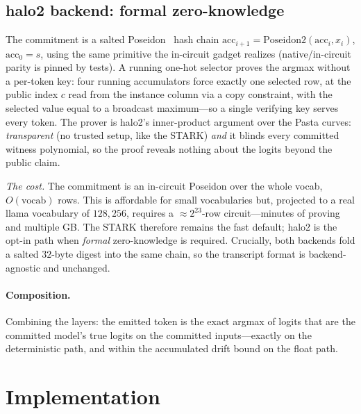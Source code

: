 \documentclass[11pt]{article}
\begin{document}
\subsection{halo2 backend: formal zero-knowledge}
The commitment is a salted Poseidon~\cite{poseidon} hash chain
$\text{acc}_{i+1} = \mathrm{Poseidon2}(\text{acc}_i, x_i)$, $\text{acc}_0 = s$,
using the same primitive the in-circuit gadget realizes (native/in-circuit
parity is pinned by tests). A running one-hot selector proves the argmax without
a per-token key: four running accumulators force exactly one selected row, at the
public index $c$ read from the instance column via a copy constraint, with the
selected value equal to a broadcast maximum---so a single verifying key serves
every token. The prover is halo2's inner-product argument over the Pasta curves:
\emph{transparent} (no trusted setup, like the STARK) \emph{and} it blinds every
committed witness polynomial, so the proof reveals nothing about the logits
beyond the public claim.

\emph{The cost.} The commitment is an in-circuit Poseidon over the whole vocab,
$O(\text{vocab})$ rows. This is affordable for small vocabularies but, projected
to a real llama vocabulary of $128{,}256$, requires a ${\approx}2^{23}$-row
circuit---minutes of proving and multiple GB. The STARK therefore remains the
fast default; halo2 is the opt-in path when \emph{formal} zero-knowledge is
required. Crucially, both backends fold a salted $32$-byte digest into the same
chain, so the transcript format is backend-agnostic and unchanged.

\paragraph{Composition.} Combining the layers: the emitted token is the exact
argmax of logits that are the committed model's true logits on the committed
inputs---exactly on the deterministic path, and within the accumulated drift
bound on the float path.

\section{Implementation}\label{sec:impl}
\end{document}

